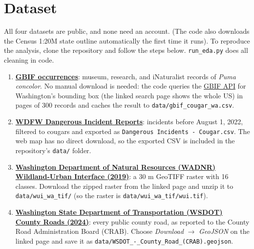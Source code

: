 \documentclass[11pt, a4paper]{article}
\begin{document}
\section{Dataset}
All four datasets are public, and none need an account. (The code also downloads the Census 1:20M state outline automatically the first time it runs). To reproduce the analysis, clone the repository and follow the steps below. \texttt{run\_eda.py} does all cleaning in code.
\begin{enumerate}
  \item \textbf{\href{https://www.gbif.org/occurrence/search?taxonKey=4QHKG&taxonKey=5KSLV&taxonKey=5KSLR&hasCoordinate=true&hasGeospatialIssue=false&country=US}{GBIF occurrences}}: museum, research, and iNaturalist records of \textit{Puma concolor}. No manual download is needed: the code queries the \href{https://api.gbif.org/v1/occurrence/search}{GBIF API} for Washington's bounding box (the linked search page shows the whole US) in pages of 300 records and caches the result to \texttt{data/gbif\_cougar\_wa.csv}.
  \item \textbf{\href{https://wdfw.maps.arcgis.com/apps/webappviewer/index.html?id=35dae8aafe84486d8aaef1a4b74a87e1}{WDFW Dangerous Incident Reports}}: incidents before August 1, 2022, filtered to cougars and exported as \texttt{Dangerous Incidents - Cougar.csv}. The web map has no direct download, so the exported CSV is included in the repository's \texttt{data/} folder.
  \item \textbf{\href{https://data-wadnr.opendata.arcgis.com/maps/581ce1cdcf0c46f0b39dc3264ec05d96/about}{Washington Department of Natural Resources (WADNR) Wildland-Urban Interface (2019)}}: a 30 m GeoTIFF raster with 16 classes. Download the zipped raster from the linked page and unzip it to \texttt{data/wui\_wa\_tif/} (so the raster is \texttt{data/wui\_wa\_tif/wui.tif}).
  \item \textbf{\href{https://geo.wa.gov/datasets/93b79a6fa8554e19b462a2905cbcc314_0/}{Washington State Department of Transportation (WSDOT) County Roads (2024)}}: every public county road, as reported to the County Road Administration Board (CRAB). Choose \emph{Download} $\rightarrow$ \emph{GeoJSON} on the linked page and save it as \texttt{data/WSDOT\_-\_County\_Road\_(CRAB).geojson}.
\end{enumerate}
\end{document}
